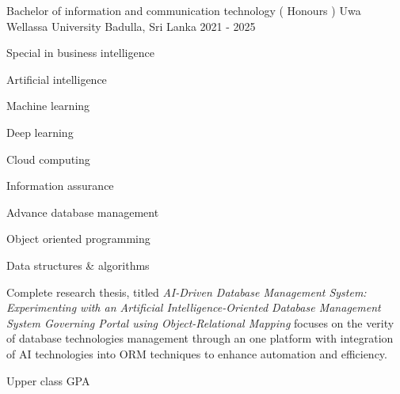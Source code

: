 

\begin{cventries}

  \cventry
    {Bachelor of information and communication technology ( Honours )} %
    {Uwa Wellassa University} %
    {Badulla, Sri Lanka} %
    {2021 - 2025} %
    {
      \begin{cvitems} %
        \item {Special in business intelligence }
        \item {Artificial intelligence}
        \item {Machine learning}
        \item {Deep learning}
        \item {Cloud computing}
        \item {Information assurance }
        \item {Advance database management}
        \item {Object oriented programming}
        \item {Data structures  &  algorithms}
        \item {Complete research thesis, titled 
          \textit{AI-Driven Database Management System: Experimenting with an Artificial Intelligence-Oriented Database Management System Governing Portal using Object-Relational Mapping} focuses on the verity of database technologies management through an one platform with integration of AI technologies into ORM techniques to enhance automation and efficiency.}
        \item {Upper class GPA}
      \end{cvitems}
    }

\end{cventries}
